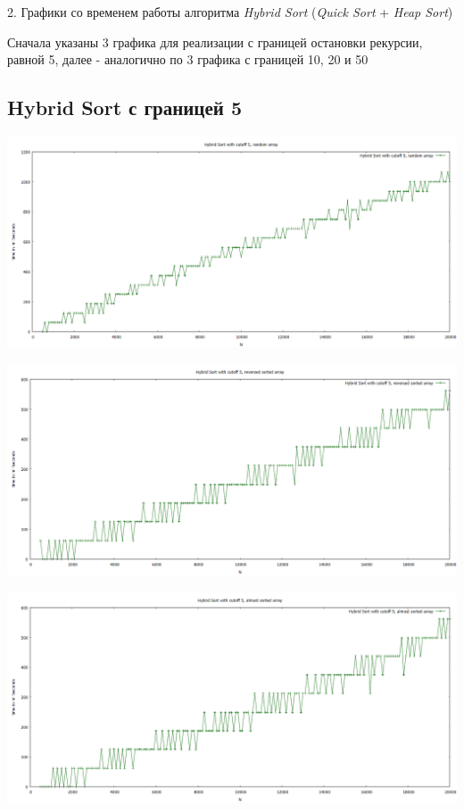 \documentclass[11pt,a4paper]{article}
\begin{document}
\pagebreak

2. Графики со временем работы алгоритма \textit{Hybrid Sort} (\textit{Quick Sort} + \textit{Heap Sort})

Сначала указаны 3 графика для реализации с границей остановки рекурсии, равной 5, далее - аналогично по 3 графика с границей 10, 20 и 50

\subsection*{Hybrid Sort с границей 5}

\hspace*{-2cm} \includegraphics[scale=0.5]{hybrid_sort_5_random_arr.PNG}

\hspace*{-2cm} \includegraphics[scale=0.5]{hybrid_sort_5_reversed_arr.PNG}

\hspace*{-2cm} \includegraphics[scale=0.5]{hybrid_sort_5_almost_sorted_arr.PNG}
\end{document}
